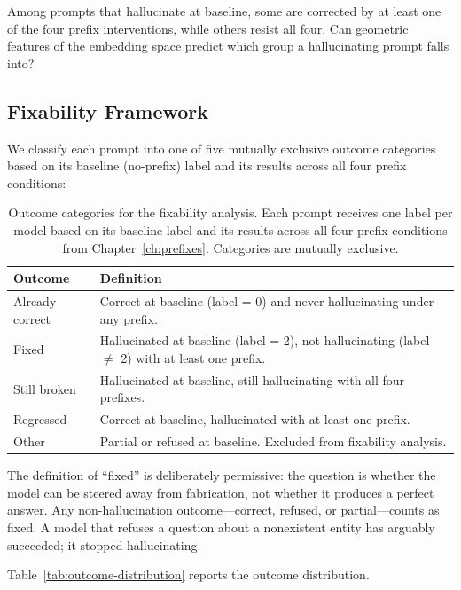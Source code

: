 Among prompts that hallucinate at baseline, some are corrected by at least one of the four prefix interventions, while others resist all four. Can geometric features of the embedding space predict which group a hallucinating prompt falls into?

\subsection{Fixability Framework}
\label{sec:fixability-framework}

We classify each prompt into one of five mutually exclusive outcome categories based on its baseline (no-prefix) label and its results across all four prefix conditions:

\begin{table}[ht]
\centering
\small
\begin{tabular}{@{}lp{9.5cm}@{}}
\toprule
\textbf{Outcome} & \textbf{Definition} \\
\midrule
Already correct & Correct at baseline (label = 0) and never hallucinating under any prefix. \\
Fixed & Hallucinated at baseline (label = 2), not hallucinating (label $\neq$ 2) with at least one prefix. \\
Still broken & Hallucinated at baseline, still hallucinating with all four prefixes. \\
Regressed & Correct at baseline, hallucinated with at least one prefix. \\
Other & Partial or refused at baseline. Excluded from fixability analysis. \\
\bottomrule
\end{tabular}
\caption{Outcome categories for the fixability analysis. Each prompt receives one label per model based on its baseline label and its results across all four prefix conditions from Chapter~\ref{ch:prefixes}. Categories are mutually exclusive.}
\label{tab:fixability-definitions}
\end{table}

The definition of ``fixed'' is deliberately permissive: the question is whether the model can be steered away from fabrication, not whether it produces a perfect answer. Any non-hallucination outcome---correct, refused, or partial---counts as fixed. A model that refuses a question about a nonexistent entity has arguably succeeded; it stopped hallucinating.

Table~\ref{tab:outcome-distribution} reports the outcome distribution.

